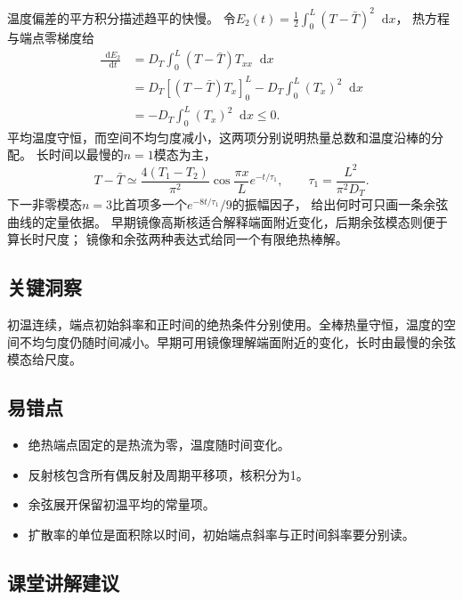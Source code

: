 \documentclass[UTF8,fontset=fandol,a4paper,11pt]{ctexart}
\newcommand{\dd}{\mathop{}\!\mathrm{d}}
\begin{document}
温度偏差的平方积分描述趋平的快慢。
令$E_2(t)=\tfrac12\int_0^L(T-\bar T)^2\dd x$，
热方程与端点零梯度给
\[
\begin{aligned}
\frac{\dd E_2}{\dd t}
&=D_T\int_0^L(T-\bar T)T_{xx}\dd x\\
&=D_T[(T-\bar T)T_x]_0^L
-D_T\int_0^L(T_x)^2\dd x\\
&=-D_T\int_0^L(T_x)^2\dd x\le0.
\end{aligned}
\]
平均温度守恒，而空间不均匀度减小，这两项分别说明热量总数和温度沿棒的分配。
长时间以最慢的$n=1$模态为主，
\[
T-\bar T\simeq\frac{4(T_1-T_2)}{\pi^2}
\cos\frac{\pi x}{L}e^{-t/\tau_1},\qquad
\tau_1=\frac{L^2}{\pi^2D_T}.
\]
下一非零模态$n=3$比首项多一个$e^{-8t/\tau_1}/9$的振幅因子，
给出何时可只画一条余弦曲线的定量依据。
早期镜像高斯核适合解释端面附近变化，后期余弦模态则便于算长时尺度；
镜像和余弦两种表达式给同一个有限绝热棒解。




\subsection*{关键洞察}

初温连续，端点初始斜率和正时间的绝热条件分别使用。全棒热量守恒，温度的空间不均匀度仍随时间减小。早期可用镜像理解端面附近的变化，长时由最慢的余弦模态给尺度。



\subsection*{易错点}

\begin{itemize}
\item 绝热端点固定的是热流为零，温度随时间变化。
\item 反射核包含所有偶反射及周期平移项，核积分为1。
\item 余弦展开保留初温平均的常量项。
\item 扩散率的单位是面积除以时间，初始端点斜率与正时间斜率要分别读。
\end{itemize}



\subsection*{课堂讲解建议}
\end{document}

